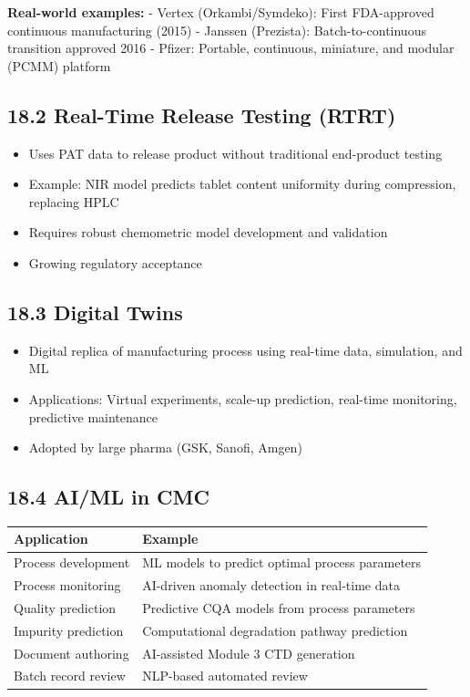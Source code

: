 \documentclass[
  11pt,
  a4paper,
]{report}
\providecommand{\tightlist}{%
  \setlength{\itemsep}{0pt}\setlength{\parskip}{0pt}}
\begin{document}
\textbf{Real-world examples:} - Vertex (Orkambi/Symdeko): First
FDA-approved continuous manufacturing (2015) - Janssen (Prezista):
Batch-to-continuous transition approved 2016 - Pfizer: Portable,
continuous, miniature, and modular (PCMM) platform

\hypertarget{real-time-release-testing-rtrt}{%
\subsection{18.2 Real-Time Release Testing
(RTRT)}\label{real-time-release-testing-rtrt}}

\begin{itemize}
\tightlist
\item
  Uses PAT data to release product without traditional end-product
  testing
\item
  Example: NIR model predicts tablet content uniformity during
  compression, replacing HPLC
\item
  Requires robust chemometric model development and validation
\item
  Growing regulatory acceptance
\end{itemize}

\hypertarget{digital-twins}{%
\subsection{18.3 Digital Twins}\label{digital-twins}}

\begin{itemize}
\tightlist
\item
  Digital replica of manufacturing process using real-time data,
  simulation, and ML
\item
  Applications: Virtual experiments, scale-up prediction, real-time
  monitoring, predictive maintenance
\item
  Adopted by large pharma (GSK, Sanofi, Amgen)
\end{itemize}

\hypertarget{aiml-in-cmc}{%
\subsection{18.4 AI/ML in CMC}\label{aiml-in-cmc}}

\begin{longtable}[]{@{}ll@{}}
\toprule
Application & Example\tabularnewline
\midrule
\endhead
Process development & ML models to predict optimal process
parameters\tabularnewline
Process monitoring & AI-driven anomaly detection in real-time
data\tabularnewline
Quality prediction & Predictive CQA models from process
parameters\tabularnewline
Impurity prediction & Computational degradation pathway
prediction\tabularnewline
Document authoring & AI-assisted Module 3 CTD generation\tabularnewline
Batch record review & NLP-based automated review\tabularnewline
\bottomrule
\end{longtable}
\end{document}
